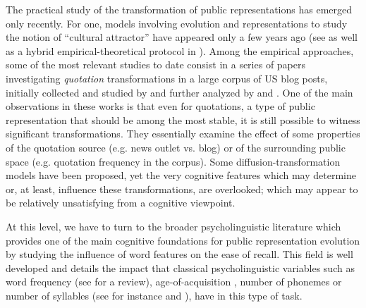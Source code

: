 The practical study of the transformation of public representations has emerged only recently.
For one, models involving evolution and representations to study the notion of ``cultural attractor'' have appeared only a few years ago (see \citet{Claidiere07,claidiere2014darwinian} as well as a hybrid empirical-theoretical protocol in \citet{maccallum2012evolution}).
Among the empirical approaches, some of the most relevant studies to date consist in a series of papers investigating \emph{quotation} transformations in a large corpus of US blog posts, initially collected and studied by \citet{Leskovec09} and further analyzed by \citet{Simmons11} and \citet{omod-mult}.
One of the main observations in these works is that even for quotations, a type of public representation that should be among the most stable, it is still possible to witness significant transformations. They essentially examine the effect of some properties of the quotation source (\hbox{e.g.} news outlet {vs.} blog) or of the surrounding public space (\hbox{e.g.} quotation frequency in the corpus). Some diffusion-transformation models have been proposed, yet the very cognitive features which may determine or, at least, influence these transformations, are overlooked; which may appear to be relatively unsatisfying from a cognitive viewpoint.


At this level, we have to turn to the broader psycholinguistic literature which provides one of the main cognitive foundations for public representation evolution by studying the influence of word features on the ease of recall.
This field is well developed and details the impact that classical psycholinguistic variables such as word frequency (see \citet{Yonelinas02} for a review), age-of-acquisition \citep{Zevin02}, number of phonemes or number of syllables (see for instance \citet{Rey98} and \citet{nick-diss}), have in this type of task.

